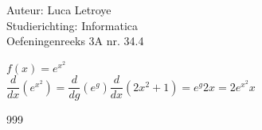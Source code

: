 \documentclass[a4paper]{article}
\newcommand{\ddx}{\dfrac{d}{dx}}
\newcommand{\ddg}{\dfrac{d}{dg}}
\begin{document}
  
\noindent \large Auteur: Luca Letroye \\
\noindent \large Studierichting: Informatica\\
\noindent \large Oefeningenreeks 3A nr. 34.4\\

\medskip

\normalsize
$f(x) = e^{x^2}$\\

$\ddx \left(e^{x^2} \right)= \ddg \left(e^g \right) \ddx \left(2x^2 +1 \right) = e^g 2x = 2e^{x^2} x$




\begin{thebibliography}{999}
\end{thebibliography}
\end{document}
